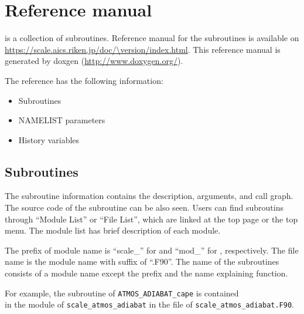 \section{Reference manual} \label{sec:reference_manual}
\scalelib is a collection of subroutines.
Reference manual for the subroutines is available on\\
\url{https://scale.aics.riken.jp/doc/\version/index.html}.
This reference manual is generated by doxgen (\url{http://www.doxygen.org/}).

The reference has the following information:
\begin{itemize}
\item Subroutines
\item NAMELIST parameters
\item History variables
\end{itemize}


\subsection{Subroutines}
The subroutine information contains the description, arguments, and call graph.
The source code of the subroutine can be also seen.
Users can find subroutins through ``Module List'' or ``File List'', which are linked at the top page or the top menu.
The module list has brief description of each module.

The prefix of module name is ``scale\_'' for \scalelib and ``mod\_'' for \scalerm, respectively.
The file name is the module name with suffix of ``.F90''.
The name of the subroutines consists of a module name except the prefix and the name explaining function.

For example, the subroutine of \verb|ATMOS_ADIABAT_cape| is contained \\
in the module of \verb|scale_atmos_adiabat| in the file of \verb|scale_atmos_adiabat.F90|.





